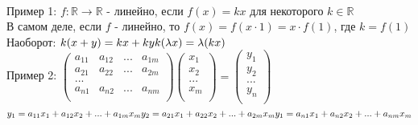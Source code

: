 \documentclass[12pt, oneside]{book}
\theoremstyle{definition}
\begin{document}
\begin{enumerate}
\begin{figure}[h!]
\end{figure}\\
Пример 1: $f: \mathbb{R} \longrightarrow \mathbb{R}$ - линейно, если $f(x) = kx$ для некоторого $k\in \mathbb{R}$\\
В самом деле, если $f$ - линейно, то $f(x) = f(x\cdot 1) = x\cdot f(1)$, где $k = f(1)$\\
Наоборот: $k(x+y) = kx + ky\\
k(\lambda x) = \lambda (kx)$\\
Пример 2: $\begin{pmatrix}
a_{11}  &  a_{12}  & ...  &  a_{1m} \\
a_{21}  &  a_{22}  & ...  &  a_{2m} \\
... \\
a_{n1}  &  a_{n2}  & ...  &  a_{nm} \\
\end{pmatrix}
\begin{pmatrix}
x_1 \\
x_2 \\
... \\
x_m \\
\end{pmatrix} = 
\begin{pmatrix}
y_1 \\
y_2 \\
... \\
y_n \\
\end{pmatrix}$\\
$y_1 = a_{11} x_1 + a_{12} x_2 + ... + a_{1m} x_m\\
y_2 = a_{21} x_1 + a_{22} x_2 + ... + a_{2m} x_m\\
y_1 = a_{n1} x_1 + a_{n2} x_2 + ... + a_{nm} x_m$\\


\end{enumerate}
\end{document}
